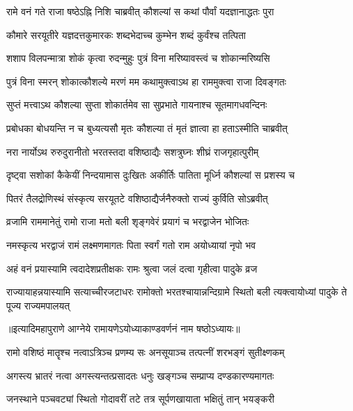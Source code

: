 \twolineshloka
{रामे वनं गते राजा षष्ठेऽह्नि निशि चाब्रवीत्}
{कौशल्यां स कथां पौर्वां यदज्ञानाद्धतः पुरा} %

\twolineshloka
{कौमारे सरयूतीरे यज्ञदत्तकुमारकः}
{शब्दभेदाच्च कुम्भेन शब्दं कुर्वंश्च तत्पिता} %

\twolineshloka
{शशाप विलपन्मात्रा शोकं कृत्वा रुदन्मुहुः}
{पुत्रं विना मरिष्यावस्त्वं च शोकान्मरिष्यसि} %

\twolineshloka
{पुत्रं विना स्मरन् शोकात्कौशल्ये मरणं मम}
{कथामुक्त्वाऽथ हा राममुक्त्वा राजा दिवङ्गतः} %

\twolineshloka
{सुप्तं मत्त्वाऽथ कौशल्या सुप्ता शोकार्तमेव सा}
{सुप्रभाते गायनाश्च सूतमागधवन्दिनः} %

\twolineshloka
{प्रबोधका बोधयन्ति न च बुध्यत्यसौ मृतः}
{कौशल्या तं मृतं ज्ञात्वा हा हताऽस्मीति चाब्रवीत्} %

\twolineshloka
{नरा नार्योऽथ रुरुदुरानीतो भरतस्तदा}
{वशिष्ठाद्यैः सशत्रुघ्नः शीघ्रं राजगृहात्पुरीम्} %

\twolineshloka
{दृष्ट्वा सशोकां कैकेयीं निन्दयामास दुःखितः}
{अकीर्तिः पातिता मूर्ध्नि कौशल्यां स प्रशस्य च} %

\twolineshloka
{पितरं तैलद्रोणिस्थं संस्कृत्य सरयूतटे}
{वशिष्ठाद्यैर्जनैरुक्तो राज्यं कुर्विति सोऽब्रवीत्} %

\twolineshloka
{व्रजामि राममानेतुं रामो राजा मतो बली}
{शृङ्गवेरं प्रयागं च भरद्वाजेन भोजितः} %

\twolineshloka
{नमस्कृत्य भरद्वाजं रामं लक्ष्मणमागतः}
{पिता स्वर्गं गतो राम अयोध्यायां नृपो भव} %

\twolineshloka
{अहं वनं प्रयास्यामि त्वदादेशप्रतीक्षकः}
{रामः श्रुत्वा जलं दत्वा गृहीत्वा पादुके व्रज} %

\threelineshloka
{राज्यायाहन्नयास्यामि सत्याच्चीरजटाधरः}
{रामोक्तो भरतश्चायान्नन्दिग्रामे स्थितो बली}
{त्यक्त्वायोध्यां पादुके ते पूज्य राज्यमपालयत्} %

॥इत्यादिमहापुराणे आग्नेये रामायणेऽयोध्याकाण्डवर्णनं नाम षष्ठोऽध्यायः॥



\twolineshloka
{रामो वशिष्ठं मातॄश्च नत्वाऽत्रिञ्च प्रणम्य सः}
{अनसूयाञ्च तत्पत्नीं शरभङ्गं सुतीक्ष्णकम्}%

\twolineshloka
{अगस्त्य भ्रातरं नत्वा अगस्त्यन्तत्प्रसादतः}
{धनुः खङ्गञ्च सम्प्राप्य दण्डकारण्यमागतः}%

\twolineshloka
{जनस्थाने पञ्चवट्यां स्थितो गोदावरीं तटे}
{तत्र सूर्पणखायाता भक्षितुं तान् भयङ्करी}%

